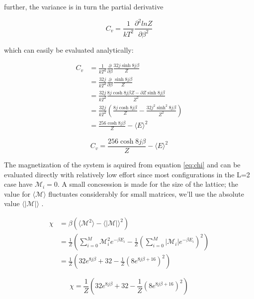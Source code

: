 \documentclass[12pt]{article}
\begin{document}
\noindent further, the variance is in turn the partial derivative 

\begin{equation}
C_v = \frac{1}{kT^2}\frac{\partial ^2 ln Z}{\partial \beta ^2}
\end{equation}

\noindent which can easily be evaluated analytically: 

\begin{align*}
C_v &= \frac{1}{kT^2}\frac{\partial}{\partial \beta}  \frac{32 j \sinh{8j \beta} }{Z}\\
 &= \frac{32j}{kT^2}\frac{\partial }{\partial \beta} \frac{\sinh{8j \beta} }{Z} \\
 &= \frac{32j}{kT^2} \frac{8j\cosh{8j\beta} Z - \partial Z \sinh{8j\beta}}{Z^2} \\
 &= \frac{32j}{kT^2} \left( \frac{8j \cosh{8j \beta}}{Z} - \frac{32 j^2 \sinh ^2 {8j\beta}}{Z^2}\right) \\
 &= \frac{256 \cosh{8j\beta}}{Z} - \langle E \rangle ^2
\end{align*}

\begin{equation}\label{eq:cv}
C_v = \frac{256 \cosh{8j\beta}}{Z} - \langle E \rangle ^2
\end{equation}

\noindent The magnetization of the system is aquired from equation \ref{eq:chi} and can be evaluated directly with relatively low effort since most configurations in the L=2 case have $\mathscr{M}_i = 0$. A small concsession is made for the size of the lattice; 	 the value for $\langle \mathscr{M} \rangle$ fluctuates considerably for small matrices, we'll use the absolute value  $\langle | \mathscr{M} | \rangle$ . 

\begin{align*}
\chi &= \beta(\langle \mathscr{M} ^ 2 \rangle - \langle |\mathscr{M}| \rangle ^2) \\
     &= \frac{1}{Z} \left( \sum ^M _{i = 0} \mathscr{M}_i^2 e^{- \beta E_i} - \frac{1}{Z}\left( \sum ^M _{i = 0} |\mathscr{M}_i| e^{- \beta E_i}\right)^2 \right) \\     
 &= \frac{1}{Z} \left(32e^{8j\beta} + 32 - \frac{1}{Z}\left(8e^{8j\beta + 16}\right)^2 \right)
\end{align*}


\begin{equation}\label{eq:chi}
\chi = \frac{1}{Z} \left(32e^{8j\beta} + 32 - \frac{1}{Z}\left(8e^{8j\beta + 16}\right)^2 \right)
\end{equation}
\end{document}
